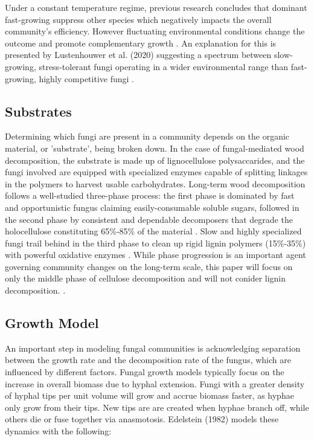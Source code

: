 \documentclass[12pt]{article}
\begin{document}
\begin{multicols}{2}
Under a constant temperature regime, previous research concludes that dominant fast-growing suppress other species which negatively impacts the overall community's efficiency. However fluctuating environmental conditions change the outcome and promote complementary growth \cite{Toljander2006}. An explanation for this is presented by Lustenhouwer et al. (2020) suggesting a spectrum between slow-growing, stress-tolerant fungi operating in a wider environmental range than fast-growing, highly competitive fungi \cite{Lustenhouwer2020}. 

\subsection{Substrates}
Determining which fungi are present in a community depends on the organic material, or 'substrate', being broken down. In the case of fungal-mediated wood decomposition, the substrate is made up of lignocellulose polysaccarides, and the fungi involved are equipped with specialized enzymes capable of splitting linkages in the polymers to harvest usable carbohydrates. Long-term wood decomposition follows a well-studied three-phase process: the first phase is dominated by fast and opportunistic fungus claiming easily-consumable soluble sugars, followed in the second phase by consistent and dependable decomposers that degrade the holocellulose constituting 65\%-85\% of the material \cite{Segato2014}. Slow and highly specialized fungi trail behind in the third phase to clean up rigid lignin polymers (15\%-35\%) with powerful oxidative enzymes \cite{Moorhead2006}. While phase progression is an important agent governing community changes on the long-term scale, this paper will focus on only the middle phase of cellulose decomposition and will not conider lignin decomposition. \cite{Lustenhouwer2020}.

\subsection{Growth Model}
An important step in modeling fungal communities is acknowledging separation between the growth rate and the decomposition rate of the fungus, which are influenced by different factors. Fungal growth models typically focus on the increase in overall biomass due to hyphal extension. Fungi with a greater density of hyphal tips per unit volume will grow and accrue biomass faster, as hyphae only grow from their tips. New tips are are created when hyphae branch off, while others die or fuse together via anasmotosis. Edelstein (1982) models these dynamics with the following:


\end{multicols}
\end{document}
